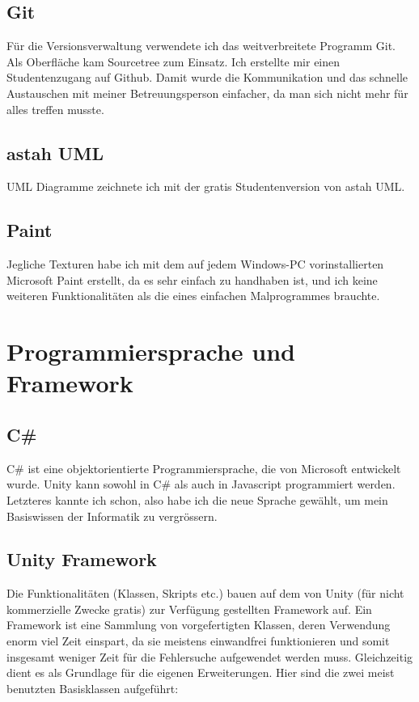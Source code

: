 \subsection{Git}

Für die Versionsverwaltung verwendete ich das weitverbreitete Programm Git. Als Oberfläche kam Sourcetree zum Einsatz.
Ich erstellte mir einen Studentenzugang auf Github.
Damit wurde die Kommunikation und das schnelle Austauschen mit meiner Betreuungsperson einfacher, da man sich nicht mehr für alles treffen musste.

\subsection{astah UML}

UML Diagramme zeichnete ich mit der gratis Studentenversion von astah UML.

\subsection{Paint}
Jegliche Texturen habe ich mit dem auf jedem Windows-PC vorinstallierten  Microsoft Paint erstellt, da es sehr einfach zu handhaben ist, und ich keine weiteren Funktionalitäten als die eines einfachen Malprogrammes brauchte.

\section{Programmiersprache und Framework}

\subsection{C\#}
C\# ist eine objektorientierte Programmiersprache, die von Microsoft entwickelt wurde.
Unity kann sowohl in C\# als auch in Javascript programmiert werden.
Letzteres kannte ich schon, also habe ich die neue Sprache gewählt, um mein Basiswissen der Informatik zu vergrössern.

\subsection{Unity Framework}
Die Funktionalitäten (Klassen, Skripts etc.) bauen auf dem von Unity (für nicht kommerzielle Zwecke gratis) zur Verfügung gestellten Framework auf.
Ein Framework ist eine Sammlung von vorgefertigten Klassen, deren Verwendung enorm viel Zeit einspart, da sie meistens einwandfrei funktionieren und somit insgesamt weniger Zeit für die Fehlersuche aufgewendet werden muss. Gleichzeitig dient es als Grundlage für die eigenen Erweiterungen.
Hier sind die zwei meist benutzten Basisklassen aufgeführt:

